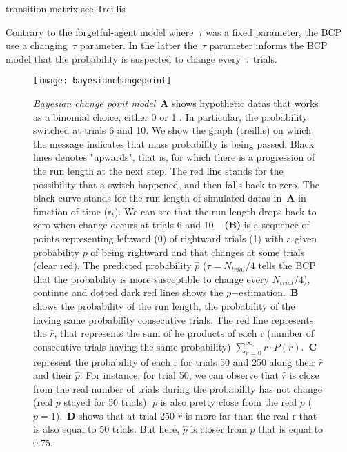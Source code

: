 \documentclass[profile,final,english, draft]{article}%
\newcommand{\seeFig}[1]{Figure~\ref{fig:#1}}
\begin{document}
transition matrix see Treillis

Contrary to the forgetful-agent model where~$\tau$ was a fixed parameter, the BCP use a changing~$\tau$ parameter. In the latter the~$\tau$ parameter informs the BCP model that the probability is suspected to change every~$\tau$ trials.

\begin{figure}%
\begin{center}
    \texttt{[image: bayesianchangepoint]}
\end{center}
\caption{\emph{Bayesian change point model}~\textbf{A} shows hypothetic datas that works as a binomial choice, either 0 or 1 . In particular, the probability switched at trials 6 and 10. We show the graph (treillis) on which the message indicates that mass probability is being passed. Black lines denotes "upwards", that is, for which there is a progression of the run length at the next step. The red line stands for the possibility that a switch happened, and then falls back to zero. The black curve stands for the run length of simulated datas in~\textbf{A} in function of time (r$_t$). We can see that the run length drops back to zero when change occurs at trials 6 and 10.
~\textbf{(B)} is a sequence of points representing leftward (0) of rightward trials (1) with a given probability $p$ of being rightward and that changes at some trials (clear red). The predicted probability $\hat{p}$ ($\tau=N_{trial}/4$ tells the BCP that the probability is more susceptible to change every $N_{trial}/4$), continue and dotted dark red lines shows the $p$$-$estimation.~\textbf{B} shows the probability of the run length, the probability of the having same probability consecutive trials. The red line represents the $\hat{r}$, that represents the sum of he products of each r (number of consecutive trials having the same probability)  $\sum_{r=0}^\infty r \cdot P(r)$.~\textbf{C} represent the probability of each r for trials 50 and 250 along their $\hat{r}$ and their $\hat{p}$. For instance, for trial 50, we can observe that $\hat{r}$ is close from the real number of trials during the probability has not change (real $p$ stayed for 50 trials). $\hat{p}$ is also pretty close from the real $p$ ($p=1$).~\textbf{D} shows that at trial 250 $\hat{r}$ is more far than the real r that is also equal to 50 trials. But here, $\hat{p}$ is closer from $p$ that is equal to 0.75.
}
\label{fig:bayesianchangepoint}
\end{figure}
\end{document}

